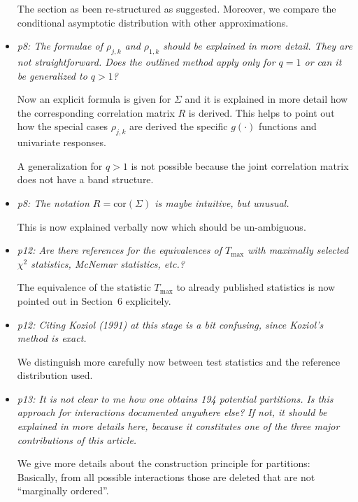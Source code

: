 \documentclass[11pt,a4paper]{article}
\begin{document}
\begin{itemize}
	The section as been re-structured as suggested. Moreover, 
        we compare the conditional asymptotic distribution with
        other approximations.
	
  \item \textit{p8: The formulae of $\rho_{j,k}$ and $\rho_{1,k}$ should be
        explained in more detail. They are not straightforward. Does the outlined
	method apply only for $q = 1$ or can it be generalized to $q > 1$?}
	
	Now an explicit formula is given for $\Sigma$ and it is explained in more
	detail how the corresponding correlation matrix $R$ is derived. This
	helps to point out how the special cases $\rho_{j, k}$ are
	derived the specific $g(\cdot)$ functions and univariate responses.
	
	A generalization for $q > 1$ is not possible because the joint correlation
	matrix does not have a band structure.
	
  \item \textit{p8: The notation $R = \mbox{cor}(\Sigma)$ is maybe intuitive, but unusual.}
  
        This is now explained verbally now which should be un-ambiguous.
	
  \item \textit{p12: Are there references for the equivalences of $T_{\max}$ with maximally
        selected $\chi^2$ statistics, McNemar statistics, etc.?}
	
	The equivalence of the statistic $T_\text{max}$ to already published
        statistics is now pointed out in Section~6 explicitely.
	
  \item \textit{p12: Citing Koziol (1991) at this stage is a bit confusing, since
        Koziol's method is exact.}
	
	We distinguish more carefully now between test statistics and the reference
	distribution used.
	
  \item \textit{p13: It is not clear to me how one obtains 194 potential partitions.
        Is this approach for interactions documented anywhere else? If not, it should be
        explained in more details here, because it constitutes one of the three major
        contributions of this article.}
	
	We give more details about the construction principle for partitions: 
        Basically, from all possible interactions those are deleted that are not 
        ``marginally ordered''.
	

\end{itemize}
\end{document}
